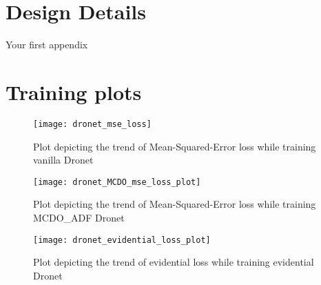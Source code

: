 


    \chapter{Design Details}
    Your first appendix

    \chapter{Training plots}
    \begin{figure}[H]
    	\centering
    	\texttt{[image: dronet\_mse\_loss]}
    	\caption{Plot depicting the trend of Mean-Squared-Error loss while training vanilla Dronet}
    	\label{fig_mse_loss_dronet}
    \end{figure}
	\begin{figure}[H]
		\centering
		\texttt{[image: dronet\_MCDO\_mse\_loss\_plot]}
		\caption{Plot depicting the trend of Mean-Squared-Error loss while training MCDO\_ADF Dronet}
		\label{fig_mse_loss_mcdo_dronet}
	\end{figure}
\begin{figure}[H]
	\centering
	\texttt{[image: dronet\_evidential\_loss\_plot]}
	\caption{Plot depicting the trend of evidential loss while training evidential Dronet}
	\label{fig_mse_loss_mcdo_dronet}
\end{figure}

